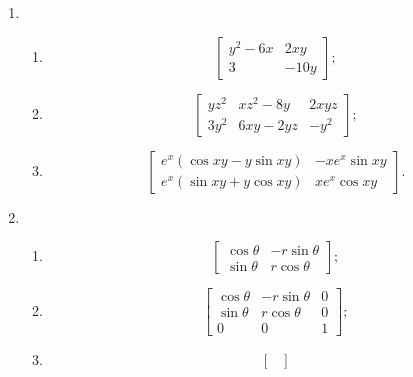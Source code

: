 \documentclass[a4paper, 11pt]{ctexart}
\begin{document}
\begin{enumerate}
    \item %
        \begin{enumerate}[(1)]
            \item %
                \[
                    \begin{bmatrix}
                        y^2-6x & 2xy \\
                        3 & -10y
                    \end{bmatrix};    
                \]
            \item %
                \[
                    \begin{bmatrix}
                        yz^2 & xz^2-8y & 2xyz \\
                        3y^2 & 6xy - 2yz & -y^2
                    \end{bmatrix};
                \]
            \item %
                \[
                    \begin{bmatrix}
                        e^x(\cos{xy} - y\sin{xy}) & -xe^x\sin{xy} \\
                        e^x(\sin{xy} + y\cos{xy}) & xe^x\cos{xy}
                    \end{bmatrix}.    
                \]
        \end{enumerate}
    \item %
        \begin{enumerate}[(1)]
            \item %
                \[
                    \begin{bmatrix}
                        \cos\theta & -r\sin\theta \\
                        \sin\theta & r\cos\theta
                    \end{bmatrix};    
                \]
            \item %
                \[
                    \begin{bmatrix}
                        \cos\theta & -r\sin\theta & 0 \\
                        \sin\theta & r\cos\theta & 0 \\
                        0 & 0 & 1
                    \end{bmatrix};    
                \]
            \item %
                \[
                    \begin{bmatrix}

\end{bmatrix}\]
\end{enumerate}
\end{enumerate}
\end{document}
